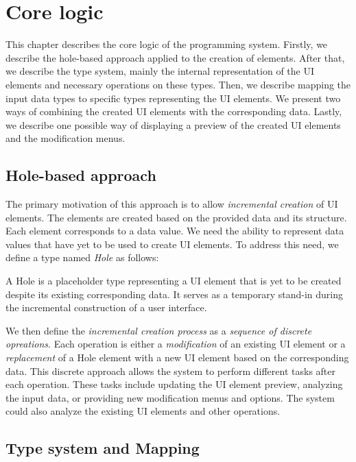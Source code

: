 \chapter{Core logic}
\label{chap:corelogic}

This chapter describes the core logic of the programming system.
Firstly, we describe the hole-based approach applied to the creation of elements.
After that, we describe the type system, mainly the internal representation of the UI elements and necessary operations on these types.
Then, we describe mapping the input data types to specific types representing the UI elements.
We present two ways of combining the created UI elements with the corresponding data.
Lastly, we describe one possible way of displaying a preview of the created UI elements and the modification menus.

\section{Hole-based approach}
\label{sec:hole-based}
The primary motivation of this approach is to allow \emph{incremental creation} of UI elements.
The elements are created based on the provided data and its structure.
Each element corresponds to a data value.
We need the ability to represent data values that have yet to be used to create UI elements.
To address this need, we define a type named \emph{Hole} as follows:
\begin{defn}
	A Hole is a placeholder type representing a UI element that is yet to be created despite its existing corresponding data. It serves as a temporary stand-in during the incremental construction of a user interface.
\end{defn}

We then define the \emph{incremental creation process} as a \emph{sequence of discrete opreations}.
Each operation is either a \emph{modification} of an existing UI element or a \emph{replacement} of a Hole element with a new UI element based on the corresponding data.
This discrete approach allows the system to perform different tasks after each operation.
These tasks include updating the UI element preview, analyzing the input data, or providing new modification menus and options.
The system could also analyze the existing UI elements and other operations.


\section{Type system and Mapping}

